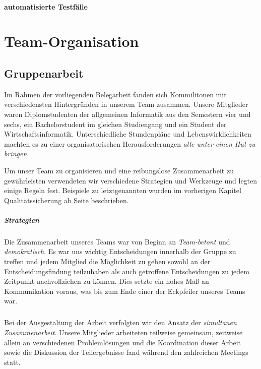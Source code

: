 \subsubsection{automatisierte Testfälle}

\chapter{Team-Organisation}
\section{Gruppenarbeit}
Im Rahmen der vorliegenden Belegarbeit fanden sich Kommilitonen mit verschiedensten Hintergründen in unserem Team zusammen. Unsere Mitglieder waren Diplomstudenten der allgemeinen Informatik aus den Semestern vier und sechs, ein Bachelorstudent im gleichen Studiengang und ein Student der Wirtschaftsinformatik. Unterschiedliche Stundenpläne und Lebenswirklichkeiten machten es zu einer organisatorischen Herausforderungen \glqq \textit{alle unter einen Hut zu bringen}\grqq.

Um unser Team zu organisieren und eine reibungslose Zusammenarbeit zu gewährleisten verwendeten wir verschiedene Strategien und Werkzeuge und legten einige Regeln fest. Beispiele zu letztgenannten wurden im vorherigen Kapitel Qualitätssicherung ab Seite \pageref{QS} beschrieben.

\paragraph{Strategien} Die Zusammenarbeit unseres Teams war von Beginn an \textit{Team-}\textit{betont} und \textit{demokratisch}. Es war uns wichtig Entscheidungen innerhalb der Gruppe zu treffen und jedem Mitglied die Möglichkeit zu geben sowohl an der Entscheidungsfindung teilzuhaben als auch getroffene Entscheidungen zu jedem Zeitpunkt nachvollziehen zu können. Dies setzte ein hohes Maß an Kommunikation voraus, was bis zum Ende einer der Eckpfeiler unseres Teams war.

\paragraph{}Bei der Ausgestaltung der Arbeit verfolgten wir den Ansatz der \textit{simultanen Zusammenarbeit}. Unsere Mitglieder arbeiteten teilweise gemeinsam, zeitweise allein an verschiedenen Problemlösungen und die Koordination dieser Arbeit sowie die Diskussion der Teilergebnisse fand während den zahlreichen Meetings statt.

